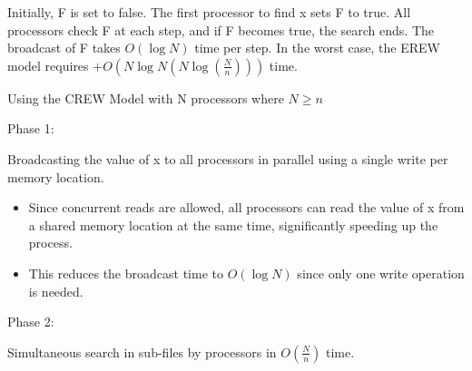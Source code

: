 \documentclass[a4paper, 10pt]{book}
\begin{document}
\begin{tcolorbox}[colback=white, colframe=black!25, title=Example]
\begin{minipage}{0.49\linewidth}
\begin{tcolorbox}[colframe=white, size=small]
\begin{itemize}
                                \end{itemize}
    
                                Initially, F is set to false. The first processor to find x sets F to true. All processors check F at each step, and if F becomes true, the search ends. The broadcast of F takes $O(\log N)$ time per step.
                                In the worst case, the EREW model requires $+ O(N\log N(N \log(\frac{N}{n})))$ time.
                            \end{tcolorbox}
                        \end{minipage}
                        \hfill
                        \begin{minipage}{0.49\linewidth} %
                            \footnotesize
                            \vspace{0.3cm}
                            \begin{tcolorbox}[colframe=white, size=small]
    
                                {\bold Using the CREW Model with N processors where $N\geq n$}
    
                                \vspace{0.3cm}

                                {\bold Phase 1:}
                                
                                Broadcasting the value of x to all processors in parallel using a single write per memory location.
    
                                \begin{itemize}
                                    
                                    \item Since concurrent reads are allowed, all processors can read the value of x from a shared memory location at the same time, significantly speeding up the process.
    
                                    \item This reduces the broadcast time to $O(\log N)$ since only one write operation is needed.
    
                                \end{itemize}

                                {\bold Phase 2:}
                                
                                Simultaneous search in sub-files by processors in $O(\frac{N}{n})$ time.
    

\end{tcolorbox}
\end{minipage}
\end{tcolorbox}
\end{document}
